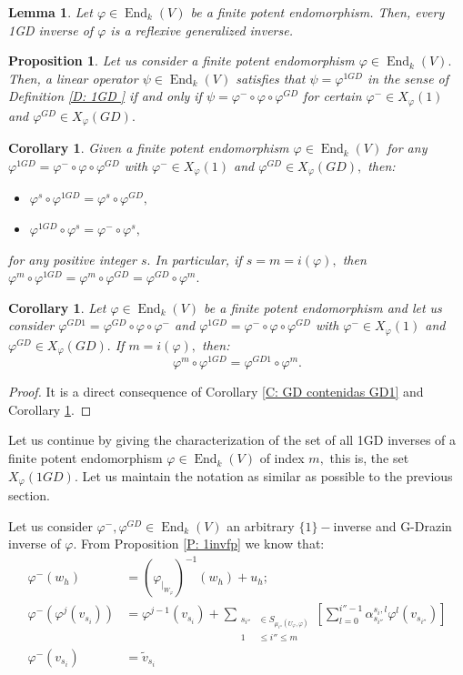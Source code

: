 \documentclass[10pt,a4paper]{amsart}
\newtheorem{cor}[defn]{Corollary}
\newtheorem{lem}[defn]{Lemma}
\newtheorem{prop}[defn]{Proposition}
\theoremstyle{plain}
\theoremstyle{remark}
\numberwithin{equation}{section} \numberwithin{defn}{section}
\newcommand\ed{\operatorname{End}}
\newcommand{\f}{\varphi}
\newcommand{\g}{\psi}
\begin{document}
\begin{lem}\label{L: 1GD son Reflex}
Let $\f \in \ed_k(V)$ be a finite potent endomorphism. Then, every 1GD inverse of $\f$ is a reflexive generalized inverse.
\end{lem}



\begin{prop}\label{P: Charact Algebraica 1GD}
Let us consider a finite potent endomorphism $\f\in \ed_k(V).$ Then, a linear operator $\g\in \ed_k(V)$ satisfies that $\g =\f^{1GD}$ in the sense of Definition \ref{D: 1GD } if and only if $\g=\f^-\circ \f \circ \f^{GD}$ for certain $\f^{-}\in X_{\f}(1)$ and $\f^{GD}\in X_{\f}(GD).$
\end{prop}


\begin{cor}\label{C: 1GD conm ind}
Given a finite potent endomorphism $\f \in \ed_k(V)$ for any $\f^{1GD}=\f^-\circ \f \circ \f^{GD}$ with $\f^{-}\in X_{\f}(1)$ and $\f^{GD}\in X_{\f}(GD),$ then: \begin{itemize}
\item $\f^s\circ \f^{1GD}=\f^s \circ \f^{GD},$
\item $\f^{1GD}\circ \f^s=\f^-\circ \f^s,$
\end{itemize} for any positive integer $s.$ In particular, if $s=m=i(\f),$ then $\f^m\circ \f^{1GD}=\f^m\circ \f^{GD}=\f^{GD}\circ \f^m.$
\end{cor}

\begin{cor}
Let $\f \in \ed_k(V)$ be a finite potent endomorphism and let us consider $\f^{GD1}=\f^{GD}\circ \f \circ \f^-$ and $\f^{1GD}=\f^-\circ \f \circ \f^{GD}$ with $\f^{-}\in X_{\f}(1)$ and $\f^{GD}\in X_{\f}(GD).$ If $m=i(\f),$ then: $$\f^m\circ \f^{1GD}=\f^{GD1}\circ \f^m. $$
\end{cor}
\begin{proof}
It is a direct consequence of Corollary \ref{C: GD contenidas GD1} and Corollary \ref{C: 1GD conm ind}.
\end{proof}

Let us continue by giving the characterization of the set of all 1GD inverses of a finite potent endomorphism $\f \in \ed_k(V)$ of index $m,$ this is, the set $X_{\f}(1GD).$ Let us maintain the notation as similar as possible to the previous section.

 Let us consider $\f^-, \f^{GD}\in \ed_k(V)$ an arbitrary $\{1\}-$inverse and G-Drazin inverse of $\f.$ From Proposition \ref{P: 1invfp} we know that:
\begin{align*}
\f^-(w_h)& =(\f_{\vert_{W_{\f}}})^{-1}(w_h)+u_h;\\
\f^-(\f^j(v_{s_i}))&=\f^{j-1}(v_{s_i})+ \underset {\begin{aligned} s_{i''} &\in S_{{\mu}_{i''} (U_\varphi, \varphi)} \\ 1 &\leq i'' \leq m \end{aligned}} \sum [\sum_{l=0}^{i''-1} \alpha_{s_{i''}}^{s_i,l} \varphi^{l} ({{v_{s_{i''}}}})]\\
\f^-(v_{s_i}) & =\tilde{v}_{s_i}
\end{align*}
\end{document}
